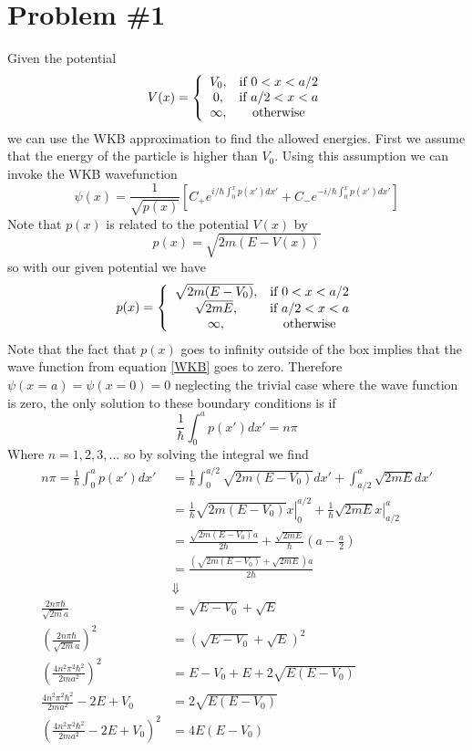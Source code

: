 \documentclass[11pt]{article}
\numberwithin{equation}{section}
\begin{document}


\section{Problem \#1}
Given the potential
$$V(x) = \left\{\begin{array}{cc}
                V_0,	&\textnormal{if } 0<x<a/2\\
                0,	&\textnormal{if } a/2<x<a\\
                \infty,	&\textnormal{otherwise} 
                 \end{array}\right.$$
we can use the WKB approximation to find the allowed energies. First we assume that the energy of the particle is higher than $V_0$. Using this assumption we can invoke the WKB wavefunction
\begin{equation}
\psi(x) = \frac{1}{\sqrt{p(x)}}\left[C_{+}e^{i/\hbar\int_{0}^{x}p(x')dx'} + C_{-}e^{-i/\hbar\int_{0}^{x}p(x')dx'}\right]
\label{WKB}
\end{equation}
Note that $p(x)$ is related to the potential $V(x)$ by
$$p(x) = \sqrt{2m(E-V(x))}$$
so with our given potential we have 
$$p(x) = \left\{\begin{array}{cc}
                \sqrt{2m(E-V_0)}, &\textnormal{if } 0<x<a/2\\
                \sqrt{2mE},       &\textnormal{if } a/2<x<a\\
                \infty,           &\textnormal{otherwise} 
                \end{array}\right.$$
Note that the fact that $p(x)$ goes to infinity outside of the box implies that the wave function from equation \ref{WKB} goes to zero. Therefore $\psi(x=a) = \psi(x=0) = 0$ neglecting the trivial case where the wave function is zero, the only solution to these boundary conditions is if
$$\frac{1}{\hbar}\int_{0}^{a}p(x')dx' = n\pi$$
Where $n=1,2,3,...$ so by solving the integral we find
\begin{align*}
n\pi = \frac{1}{\hbar}\int_{0}^{a}p(x')dx' &= \frac{1}{\hbar}\int_{0}^{a/2}\sqrt{2m(E-V_0)}dx'+\int_{a/2}^{a}\sqrt{2mE}dx'  \\
&= \frac{1}{\hbar}\left.\sqrt{2m(E-V_0)}x\right|_{0}^{a/2}+\frac{1}{\hbar}\left.\sqrt{2mE}x\right|_{a/2}^{a}  \\
&= \frac{\sqrt{2m(E-V_0)}a}{2\hbar}+\frac{\sqrt{2mE}}{\hbar}\left(a-\frac{a}{2}\right)\\
&= \frac{(\sqrt{2m(E-V_0)} + \sqrt{2mE})a}{2\hbar}\\
&\Downarrow\\
\frac{2n\pi\hbar}{\sqrt{2m}a} &= \sqrt{E-V_0} + \sqrt{E}\\
\left(\frac{2n\pi\hbar}{\sqrt{2m}a}\right)^2 &= \left(\sqrt{E-V_0} + \sqrt{E}\right)^2\\
\left(\frac{4n^2\pi^2\hbar^2}{2ma^2}\right)^2 &= E-V_0 + E + 2\sqrt{E(E-V_0)}\\
\frac{4n^2\pi^2\hbar^2}{2ma^2} - 2E + V_0 &= 2\sqrt{E(E-V_0)}\\
\left(\frac{4n^2\pi^2\hbar^2}{2ma^2} - 2E + V_0\right)^2 &= 4E(E-V_0)
\end{align*}
\end{document}
